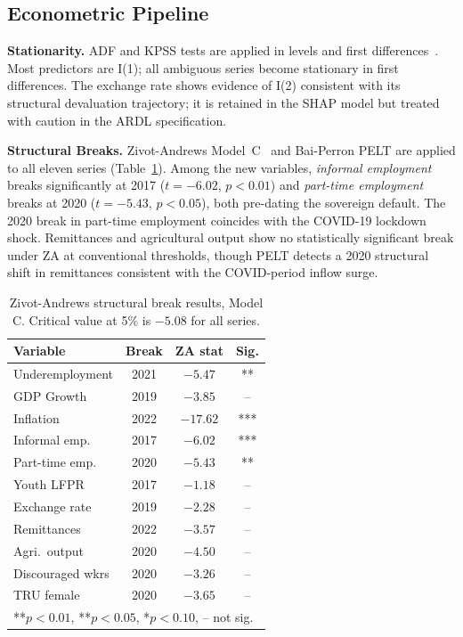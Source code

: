 \documentclass[sigconf]{acmart}
\begin{document}
\subsection{Econometric Pipeline}

\textbf{Stationarity.} ADF and KPSS tests are applied in levels and first
differences~\cite{kpss1992}. Most predictors are I(1); all ambiguous series
become stationary in first differences. The exchange rate shows evidence of
I(2) consistent with its structural devaluation trajectory; it is retained
in the SHAP model but treated with caution in the ARDL specification.

\textbf{Structural Breaks.} Zivot-Andrews Model~C~\cite{zivot1992} and Bai-Perron PELT are
applied to all eleven series (Table~\ref{tab:za}). Among the new
variables, \emph{informal employment} breaks significantly at 2017
($t{=}{-6.02}$, $p{<}0.01$) and \emph{part-time employment} breaks at 2020
($t{=}{-5.43}$, $p{<}0.05$), both pre-dating the sovereign default. The
2020 break in part-time employment coincides with the COVID-19 lockdown
shock. Remittances and agricultural output show no statistically significant
break under ZA at conventional thresholds, though PELT detects a 2020
structural shift in remittances consistent with the COVID-period inflow surge.

\begin{table}[h]
\caption{Zivot-Andrews structural break results, Model C. Critical value
  at 5\% is $-5.08$ for all series.}
\label{tab:za}
\setlength{\tabcolsep}{3pt}
\footnotesize
\begin{tabular}{lccc}
\toprule
\textbf{Variable} & \textbf{Break} & \textbf{ZA stat} & \textbf{Sig.}\\
\midrule
Underemployment   & 2021 & $-5.47$  & **  \\
GDP Growth        & 2019 & $-3.85$  & --  \\
Inflation         & 2022 & $-17.62$ & *** \\
Informal emp.     & 2017 & $-6.02$  & *** \\
Part-time emp.    & 2020 & $-5.43$  & **  \\
Youth LFPR        & 2017 & $-1.18$  & --  \\
Exchange rate     & 2019 & $-2.28$  & --  \\
Remittances       & 2022 & $-3.57$  & --  \\
Agri.\ output     & 2020 & $-4.50$  & --  \\
Discouraged wkrs  & 2020 & $-3.26$  & --  \\
TRU female        & 2020 & $-3.65$  & --  \\
\midrule
\multicolumn{4}{l}{\scriptsize ***$p{<}0.01$, **$p{<}0.05$, *$p{<}0.10$, -- not sig.}\\
\bottomrule
\end{tabular}
\end{table}
\end{document}
